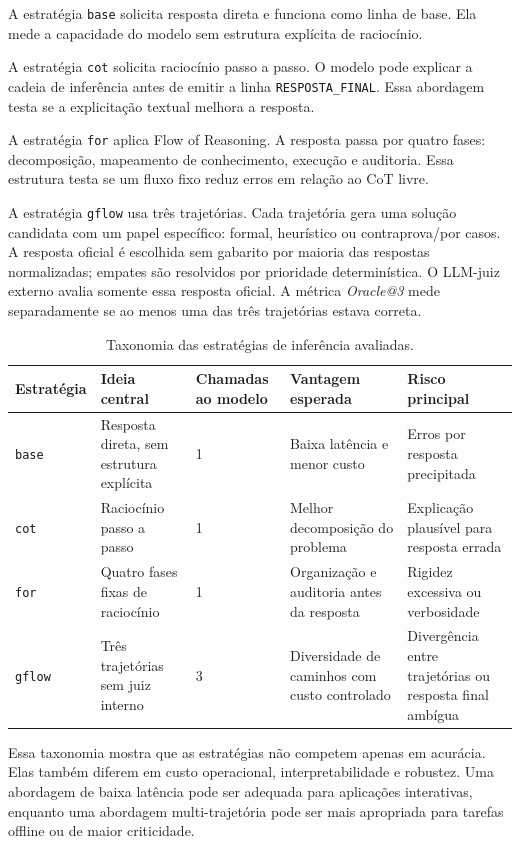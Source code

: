 \documentclass[12pt]{article}
\makeatletter
\newcommand{\oracle}{\mbox{\textit{Oracle@3}}}
\makeatother
\begin{document}
A estratégia \texttt{base} solicita resposta direta e funciona como linha de base. Ela mede a capacidade do modelo sem estrutura explícita de raciocínio.

A estratégia \texttt{cot} solicita raciocínio passo a passo. O modelo pode explicar a cadeia de inferência antes de emitir a linha \texttt{RESPOSTA\_FINAL}. Essa abordagem testa se a explicitação textual melhora a resposta.

A estratégia \texttt{for} aplica Flow of Reasoning. A resposta passa por quatro fases: decomposição, mapeamento de conhecimento, execução e auditoria. Essa estrutura testa se um fluxo fixo reduz erros em relação ao CoT livre.

A estratégia \texttt{gflow} usa três trajetórias. Cada trajetória gera uma solução candidata com um papel específico: formal, heurístico ou contraprova/por casos. A resposta oficial é escolhida sem gabarito por maioria das respostas normalizadas; empates são resolvidos por prioridade determinística. O LLM-juiz externo avalia somente essa resposta oficial. A métrica \oracle{} mede separadamente se ao menos uma das três trajetórias estava correta.

\begin{table}[ht]
\centering
\small
\caption{Taxonomia das estratégias de inferência avaliadas.}
\label{tab:estrategias}
\begin{tabular}{|p{2.3cm}|p{2.9cm}|p{2.3cm}|p{2.7cm}|p{2.5cm}|}
\hline
\textbf{Estratégia} & \textbf{Ideia central} & \textbf{Chamadas ao modelo} & \textbf{Vantagem esperada} & \textbf{Risco principal} \\
\hline
\texttt{base} & Resposta direta, sem estrutura explícita & 1 & Baixa latência e menor custo & Erros por resposta precipitada \\
\hline
\texttt{cot} & Raciocínio passo a passo & 1 & Melhor decomposição do problema & Explicação plausível para resposta errada \\
\hline
\texttt{for} & Quatro fases fixas de raciocínio & 1 & Organização e auditoria antes da resposta & Rigidez excessiva ou verbosidade \\
\hline
\texttt{gflow} & Três trajetórias sem juiz interno & 3 & Diversidade de caminhos com custo controlado & Divergência entre trajetórias ou resposta final ambígua \\
\hline
\end{tabular}
\end{table}

Essa taxonomia mostra que as estratégias não competem apenas em acurácia. Elas também diferem em custo operacional, interpretabilidade e robustez. Uma abordagem de baixa latência pode ser adequada para aplicações interativas, enquanto uma abordagem multi-trajetória pode ser mais apropriada para tarefas offline ou de maior criticidade.
\end{document}
